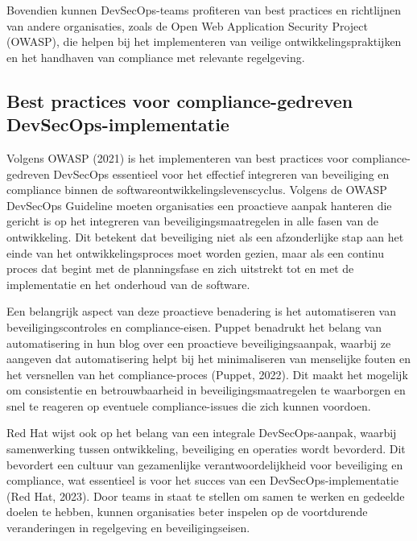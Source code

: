 \documentclass{hogent-article}
\begin{document}
  Bovendien kunnen DevSecOps-teams profiteren van best practices en richtlijnen van andere organisaties, zoals de Open Web Application Security Project (OWASP), die helpen bij het implementeren van veilige ontwikkelingspraktijken en het handhaven van compliance met relevante regelgeving.
  \autocite{EU2022}
  
  \subsection{Best practices voor compliance-gedreven DevSecOps-implementatie}
  
  Volgens OWASP (2021) is het implementeren van best practices voor compliance-gedreven DevSecOps essentieel voor het effectief integreren van beveiliging en compliance binnen de softwareontwikkelingslevenscyclus. Volgens de OWASP DevSecOps Guideline moeten organisaties een proactieve aanpak hanteren die gericht is op het integreren van beveiligingsmaatregelen in alle fasen van de ontwikkeling. Dit betekent dat beveiliging niet als een afzonderlijke stap aan het einde van het ontwikkelingsproces moet worden gezien, maar als een continu proces dat begint met de planningsfase en zich uitstrekt tot en met de implementatie en het onderhoud van de software.\autocite{OWASP2021}
  
  Een belangrijk aspect van deze proactieve benadering is het automatiseren van beveiligingscontroles en compliance-eisen. Puppet benadrukt het belang van automatisering in hun blog over een proactieve beveiligingsaanpak, waarbij ze aangeven dat automatisering helpt bij het minimaliseren van menselijke fouten en het versnellen van het compliance-proces (Puppet, 2022). Dit maakt het mogelijk om consistentie en betrouwbaarheid in beveiligingsmaatregelen te waarborgen en snel te reageren op eventuele compliance-issues die zich kunnen voordoen.\autocite{Puppet2022}
  
  Red Hat wijst ook op het belang van een integrale DevSecOps-aanpak, waarbij samenwerking tussen ontwikkeling, beveiliging en operaties wordt bevorderd. Dit bevordert een cultuur van gezamenlijke verantwoordelijkheid voor beveiliging en compliance, wat essentieel is voor het succes van een DevSecOps-implementatie (Red Hat, 2023). Door teams in staat te stellen om samen te werken en gedeelde doelen te hebben, kunnen organisaties beter inspelen op de voortdurende veranderingen in regelgeving en beveiligingseisen.\autocite{RedHat2021}
  
  
  
  
  
\end{document}
